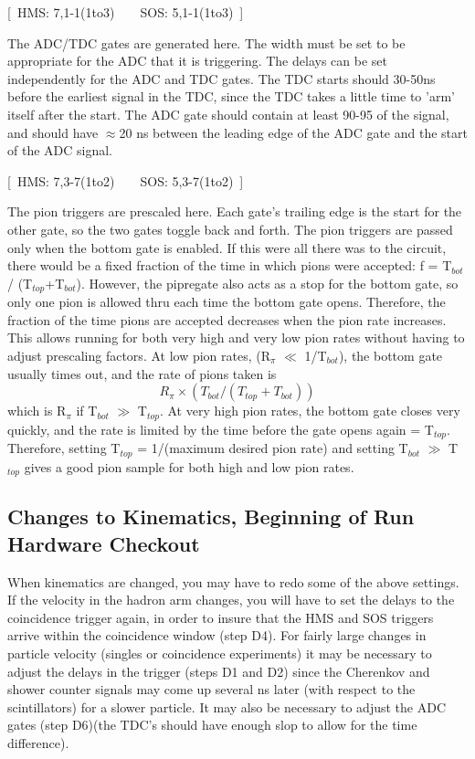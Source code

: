 \begin{description}
\item{[~HMS: 7,1-1(1to3)~~~~SOS: 5,1-1(1to3)~]}
\end{description}

The ADC/TDC gates are generated here. The width must be set to be
appropriate for the ADC that it is triggering. The delays can be set
independently for the ADC and TDC gates. The TDC starts should 30-50ns
before the earliest signal in the TDC, since the TDC takes a little time
to 'arm' itself after the start. The ADC gate should contain at least 90-95%
of the signal, and should have $\approx$20 ns between the leading edge
of the ADC gate and the start of the ADC signal.

\begin{description}
\item{[~HMS: 7,3-7(1to2)~~~~SOS: 5,3-7(1to2)~]}
\end{description}

The pion triggers are prescaled here. Each gate's trailing edge is
the start for the other gate, so the two gates toggle back and forth. The
pion triggers are passed only when the bottom gate is enabled. If this were
all there was to the circuit, there would be a fixed fraction of the time
in which pions were accepted: f = T$_{bot}$ / (T$_{top}$+T$_{bot}$). However,
the pipregate also acts as a stop for the bottom gate, so only one pion is allowed
thru each time the bottom gate opens. Therefore, the fraction of the time
pions are accepted decreases when the pion rate increases. This allows
running for both very high and very low pion rates without having to
adjust prescaling factors. At low pion rates, (R$_\pi$ $\ll$ 1/T$_{bot}$),
the bottom gate usually times out, and the rate of pions taken is
$$
	R_\pi \times (T_{bot} / (T_{top} + T_{bot}))
$$
which is R$_\pi$ if T$_{bot}$ $\gg$ T$_{top}$. At very high pion rates, the
bottom gate closes very quickly, and the rate is limited by the time before
the gate opens again = T$_{top}$. Therefore, setting T$_{top}$
= 1/(maximum desired pion rate) and setting T$_{bot}$ $\gg$ T$_{top}$
gives a good pion sample for both high and low pion rates.

\subsection {Changes to Kinematics, Beginning of Run Hardware Checkout}

When kinematics are changed, you may have to redo some of the above
settings. If the velocity in the hadron arm changes, you will have to
set the delays to the coincidence trigger again, in order to insure that the
HMS and SOS triggers arrive within the coincidence window (step D4). For
fairly large changes in particle velocity (singles or coincidence experiments)
it may be necessary to adjust the delays in the trigger (steps D1 and D2) since
the Cherenkov and shower counter signals may come up several ns later (with
respect to the scintillators) for a slower particle. It may also be necessary
to adjust the ADC gates (step D6)(the TDC's should have enough slop to allow
for the time difference).


